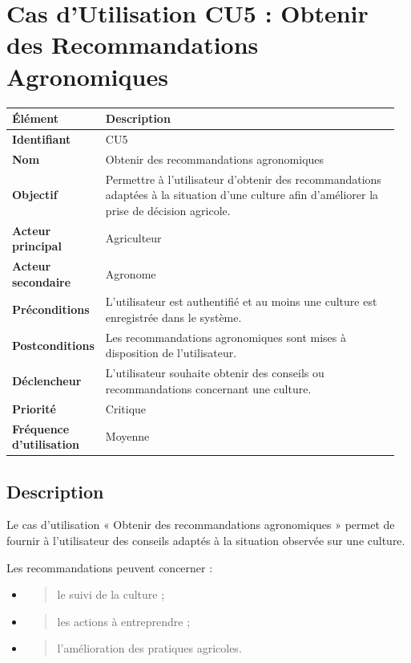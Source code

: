 \hypertarget{cas-dutilisation-cu5-obtenir-des-recommandations-agronomiques}{%
\section{Cas d'Utilisation CU5 : Obtenir des Recommandations
Agronomiques}\label{cas-dutilisation-cu5-obtenir-des-recommandations-agronomiques}}

\begin{longtable}{@{}p{0.18\linewidth}p{0.78\linewidth}@{}}
\toprule
\rowcolors{2}{gray!10}{white}
\textbf{Élément} & \textbf{Description} \\
\midrule
\endhead
\textbf{Identifiant} & CU5 \\
\textbf{Nom} & Obtenir des recommandations agronomiques \\
\textbf{Objectif} & Permettre à l'utilisateur d'obtenir des
recommandations adaptées à la situation d'une culture afin d'améliorer
la prise de décision agricole. \\
\textbf{Acteur principal} & Agriculteur \\
\textbf{Acteur secondaire} & Agronome \\
\textbf{Préconditions} & L'utilisateur est authentifié et au moins une
culture est enregistrée dans le système. \\
\textbf{Postconditions} & Les recommandations agronomiques sont mises à
disposition de l'utilisateur. \\
\textbf{Déclencheur} & L'utilisateur souhaite obtenir des conseils ou
recommandations concernant une culture. \\
\textbf{Priorité} & Critique \\
\textbf{Fréquence d'utilisation} & Moyenne \\
\bottomrule
\end{longtable}

\hypertarget{description-3}{%
\subsection{Description}\label{description-3}}

Le cas d'utilisation « Obtenir des recommandations agronomiques » permet
de fournir à l'utilisateur des conseils adaptés à la situation observée
sur une culture.

Les recommandations peuvent concerner :

\begin{itemize}
\item
  \begin{quote}
  le suivi de la culture ;
  \end{quote}
\item
  \begin{quote}
  les actions à entreprendre ;
  \end{quote}
\item
  \begin{quote}
  l'amélioration des pratiques agricoles.
  \end{quote}
\end{itemize}

